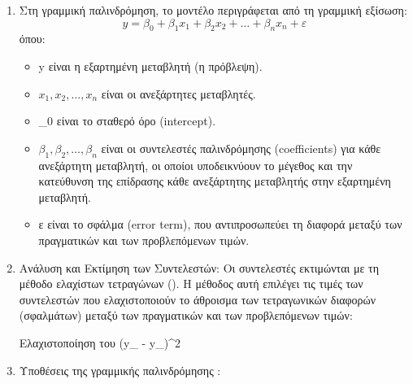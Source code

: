 \documentclass[diploma]{softlab-thesis}
\begin{document}
\begin{enumerate}
\item Στη γραμμική παλινδρόμηση, το μοντέλο περιγράφεται από τη γραμμική εξίσωση:
\[
y = \beta_0 + \beta_1 x_1 + \beta_2 x_2 + \dots + \beta_n x_n + \varepsilon
\]
όπου: 

\begin{itemize}
\item y  είναι η εξαρτημένη μεταβλητή (η πρόβλεψη).
\item \( x_1, x_2, \dots, x_n \) είναι οι ανεξάρτητες μεταβλητές.
\item \beta_0  είναι το σταθερό όρο (intercept).
\item \( \beta_1, \beta_2, \dots, \beta_n \) είναι οι συντελεστές παλινδρόμησης (coefficients) για κάθε ανεξάρτητη μεταβλητή, οι οποίοι υποδεικνύουν το μέγεθος και την κατεύθυνση της επίδρασης κάθε ανεξάρτητης μεταβλητής στην εξαρτημένη μεταβλητή.
\item ε είναι το σφάλμα (error term), που αντιπροσωπεύει τη διαφορά μεταξύ των πραγματικών και των προβλεπόμενων τιμών.
\end{itemize}

\item Ανάλυση και Εκτίμηση των Συντελεστών: Οι συντελεστές εκτιμώνται με τη μέθοδο ελαχίστων τετραγώνων (). Η μέθοδος αυτή επιλέγει τις τιμές των συντελεστών που ελαχιστοποιούν το άθροισμα των τετραγωνικών διαφορών (σφαλμάτων) μεταξύ των πραγματικών και των προβλεπόμενων τιμών:

Ελαχιστοποίηση του \sum (y_{} - y_{})^2

\item Υποθέσεις της γραμμικής παλινδρόμησης :
\begin{enumerate}


\end{enumerate}
\end{enumerate}
\end{document}
